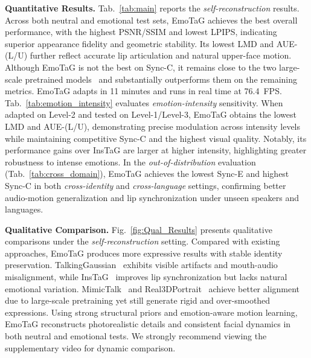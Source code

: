 \noindent \textbf{Quantitative Results.}
Tab.~\ref{tab:main} reports the \textit{self-reconstruction} results.
Across both neutral and emotional test sets, EmoTaG achieves the best overall performance, with the highest PSNR/SSIM and lowest LPIPS, indicating superior appearance fidelity and geometric stability. Its lowest LMD and AUE-(L/U) further reflect accurate lip articulation and natural upper-face motion. Although EmoTaG is not the best on Sync-C, it remains close to the two large-scale pretrained models~\cite{ye2024real3d, ye2024mimictalk} and substantially outperforms them on the remaining metrics. EmoTaG adapts in 11 minutes and runs in real time at 76.4~FPS.
Tab.~\ref{tab:emotion_intensity} evaluates \textit{emotion-intensity} sensitivity.
When adapted on Level-2 and tested on Level-1/Level-3, EmoTaG obtains the lowest LMD and AUE-(L/U), demonstrating precise modulation across intensity levels while maintaining competitive Sync-C and the highest visual quality. Notably, its performance gains over InsTaG are larger at higher intensity, highlighting greater robustness to intense emotions.
In the \textit{out-of-distribution} evaluation (Tab.~\ref{tab:cross_domain}), EmoTaG achieves the lowest Sync-E and highest Sync-C in both \textit{cross-identity} and \textit{cross-language} settings, confirming better audio-motion generalization and lip synchronization under unseen speakers and languages.

\noindent \textbf{Qualitative Comparison.}
Fig.~\ref{fig:Qual_Results} presents qualitative comparisons under the \textit{self-reconstruction} setting. 
Compared with existing approaches, EmoTaG produces more expressive results with stable identity preservation. 
TalkingGaussian~\cite{li2024talkinggaussian} exhibits visible artifacts and mouth-audio misalignment, while InsTaG~\cite{li2025instag} improves lip synchronization but lacks natural emotional variation. 
MimicTalk~\cite{ye2024mimictalk} and Real3DPortrait~\cite{ye2024real3d} achieve better alignment due to large-scale pretraining yet still generate rigid and over-smoothed expressions. 
Using strong structural priors and emotion-aware motion learning, EmoTaG reconstructs photorealistic details and consistent facial dynamics in both neutral and emotional tests. 
We strongly recommend viewing the supplementary video for dynamic comparison.

